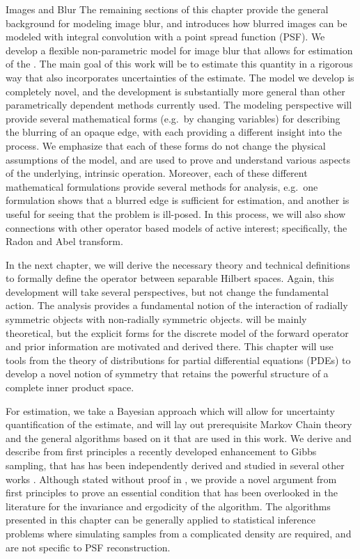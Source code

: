 \begin{chapter}{Images and Blur}
The remaining sections of this chapter provide the general background for modeling image blur, and introduces how blurred images can be modeled with integral convolution with a point spread function (PSF).
We develop a flexible non-parametric model for image blur that allows for estimation of the .
The main goal of this work will be to estimate this quantity in a rigorous way that also incorporates uncertainties of the estimate.
The model we develop is completely novel, and the development is substantially more general than other parametrically dependent methods currently used.
The modeling perspective will provide several mathematical forms (e.g.~by changing variables) for describing the blurring of an opaque edge, with each providing a different insight into the process.
 We emphasize that each of these forms do not change the physical assumptions of the model, and are used to prove and understand various aspects of the underlying, intrinsic operation. 
Moreover, each of these different mathematical formulations provide several methods for analysis, e.g.~one formulation shows that a blurred edge is sufficient for estimation, and another is useful for seeing that the problem is ill-posed.  
In this process, we will also show connections with other operator based models of active interest; specifically, the Radon and Abel transform.

  In the next chapter, we will derive the necessary theory and technical definitions to formally define the operator between separable Hilbert spaces.
  Again, this development will take several perspectives, but not change the fundamental action.
  The analysis provides a fundamental notion of the interaction of radially symmetric objects with non-radially symmetric objects.
   will be mainly theoretical, but the explicit forms for the discrete model of the forward operator and prior information are motivated and derived there.
  This chapter will use tools from the theory of distributions for partial differential equations (PDEs) to develop a novel notion of symmetry that retains the powerful structure of a complete inner product space. 

  For estimation, we take a Bayesian approach which will allow for uncertainty quantification of the estimate, and  will lay out prerequisite Markov Chain theory and the general algorithms based on it that are used in this work.
  We derive and describe from first principles a recently developed enhancement to Gibbs sampling, that has has been independently derived and studied in several other works \citep{van2008partially,agapiou2014analysis}.
  Although stated without proof in \citep{van2008partially}, we provide a novel argument from first principles to prove an essential condition that has been overlooked in the literature for the invariance and ergodicity of the algorithm.
  The algorithms presented in this chapter can be generally applied to statistical inference problems where simulating samples from a complicated density are required, and are not specific to PSF reconstruction.


\end{chapter}
